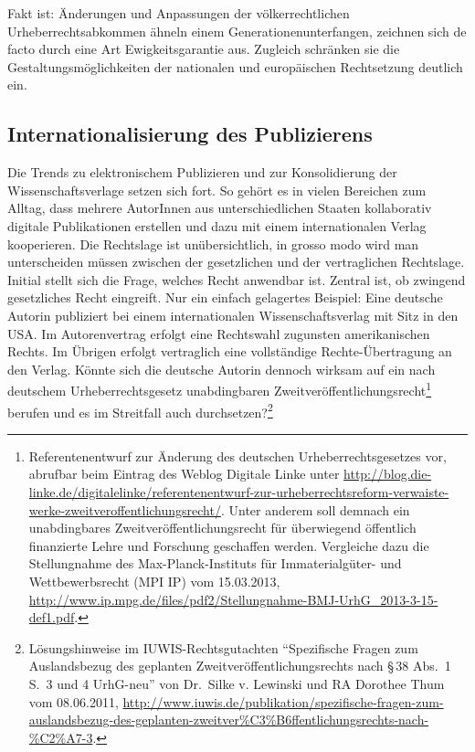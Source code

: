 \documentclass[output=paper]{langscibook}
\begin{document}
\noindent Fakt ist: Änderungen und Anpassungen der völkerrechtlichen
Urheberrechtsabkommen ähneln einem Generationenunterfangen, zeichnen
sich de facto durch eine Art Ewigkeitsgarantie aus. Zugleich schränken
sie die Gestaltungsmöglichkeiten der nationalen und europäischen
Rechtsetzung deutlich ein.

\hypertarget{internationalisierung-des-publizierens}{%
\subsection{Internationalisierung des
Publizierens}\label{internationalisierung-des-publizierens}}

Die Trends zu elektronischem Publizieren und zur Konsolidierung der
Wissenschaftsverlage setzen sich fort. So gehört es in vielen Bereichen
zum Alltag, dass mehrere AutorInnen aus unterschiedlichen Staaten
kollaborativ digitale Publikationen erstellen und dazu mit einem
internationalen Verlag kooperieren. Die Rechtslage ist unübersichtlich,
in grosso modo wird man unterscheiden müssen zwischen der gesetzlichen
und der vertraglichen Rechtslage. Initial stellt sich die Frage, welches
Recht anwendbar ist. Zentral ist, ob zwingend gesetzliches Recht
eingreift. Nur ein einfach gelagertes Beispiel: Eine deutsche Autorin
publiziert bei einem internationalen Wissenschaftsverlag mit Sitz in den
USA. Im Autorenvertrag erfolgt eine Rechtswahl zugunsten amerikanischen
Rechts. Im Übrigen erfolgt vertraglich eine vollständige
Rechte-Übertragung an den Verlag. Könnte sich die deutsche Autorin
dennoch wirksam auf ein nach deutschem Urheberrechtsgesetz unabdingbaren
Zweitveröffentlichungsrecht\footnote{Referentenentwurf zur Änderung des
  deutschen Urheberrechtsgesetzes vor, abrufbar beim Eintrag des Weblog
  Digitale Linke unter
  \url{http://blog.die-linke.de/digitalelinke/referentenentwurf-zur-urheberrechtsreform-verwaiste-werke-zweitveroffentlichungsrecht/}.
  Unter anderem soll demnach ein unabdingbares
  Zweitveröffentlichungsrecht für überwiegend öffentlich finanzierte
  Lehre und Forschung geschaffen werden. Vergleiche dazu die Stellungnahme des
  Max-Planck-Instituts für Immaterialgüter- und Wettbewerbsrecht (MPI
  IP) vom 15.03.2013,
  \url{http://www.ip.mpg.de/files/pdf2/Stellungnahme-BMJ-UrhG_2013-3-15-def1.pdf}.}
berufen und es im Streitfall auch durchsetzen?\footnote{Lösungshinweise
  im IUWIS-Rechtsgutachten \enquote{Spezifische Fragen zum Auslandsbezug
  des geplanten Zweitveröffentlichungsrechts nach §\,38 Abs.~1 S.~3 und 4
  UrhG-neu} von Dr.~Silke v. Lewinski und RA Dorothee Thum vom
  08.06.2011,
  \url{http://www.iuwis.de/publikation/spezifische-fragen-zum-auslandsbezug-des-geplanten-zweitver\%C3\%B6ffentlichungsrechts-nach-\%C2\%A7-3}.}
\end{document}

